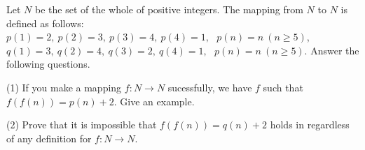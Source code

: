 Let $ N$ be the set of the whole of positive integers. The mapping from $ N$ to $ N$ is defined as follows: $ p(1)=2,\ p(2)=3,\ p(3)=4,\ p(4)=1,\ \ \ p(n)=n\ (n\geq 5)$,$ q(1)=3,\ q(2)=4,\ q(3)=2,\ q(4)=1,\ \ \ p(n)=n\ (n\geq 5)$. Answer the following questions.

(1) If you make a mapping $ f: N\rightarrow N$ sucessfully, we have $ f$ such that $ f(f(n))=p(n)+2$. Give an example.

(2) Prove that it is impossible that  $ f(f(n))=q(n)+2$ holds in regardless of any definition for $ f: N\rightarrow N$.